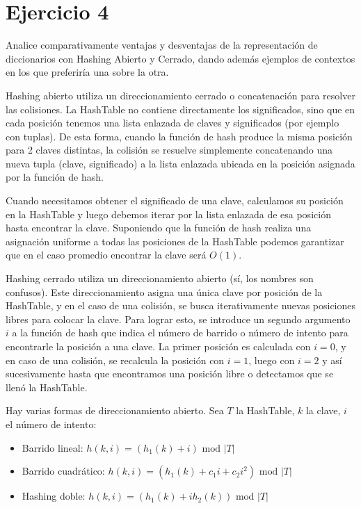 \section*{Ejercicio 4}

Analice comparativamente ventajas y desventajas de la representación de diccionarios con Hashing Abierto y Cerrado, dando además ejemplos de contextos en los que preferiría una sobre la otra.

Hashing abierto utiliza un direccionamiento cerrado o concatenación para resolver las colisiones. La HashTable no contiene directamente los significados, sino que en cada posición tenemos una lista enlazada de claves y significados (por ejemplo con tuplas). De esta forma, cuando la función de hash produce la misma posición para 2 claves distintas, la colisión se resuelve simplemente concatenando una nueva tupla (clave, significado) a la lista enlazada ubicada en la posición asignada por la función de hash.

Cuando necesitamos obtener el significado de una clave, calculamos su posición en la HashTable y luego debemos iterar por la lista enlazada de esa posición hasta encontrar la clave. Suponiendo que la función de hash realiza una asignación uniforme a todas las posiciones de la HashTable podemos garantizar que en el caso promedio encontrar la clave será $O(1)$.

Hashing cerrado utiliza un direccionamiento abierto (sí, los nombres son confusos). Este direccionamiento asigna una única clave por posición de la HashTable, y en el caso de una colisión, se busca iterativamente nuevas posiciones libres para colocar la clave. Para lograr esto, se introduce un segundo argumento $i$ a la función de hash que indica el número de barrido o número de intento para encontrarle la posición a una clave. La primer posición es calculada con $i=0$, y en caso de una colisión, se recalcula la posición con $i=1$, luego con $i=2$ y así sucesivamente hasta que encontramos una posición libre o detectamos que se llenó la HashTable.

Hay varias formas de direccionamiento abierto. Sea $T$ la HashTable, $k$ la clave, $i$ el número de intento:

\begin{itemize}
    \item Barrido lineal: $h(k, i) = (h_1(k) + i) \text{ mod } |T|$
    \item Barrido cuadrático: $h(k, i) = (h_1(k) + c_1 i + c_2 i^2) \text{ mod } |T|$
    \item Hashing doble: $h(k, i) = (h_1(k) + i h_2(k)) \text{ mod } |T|$
\end{itemize}


